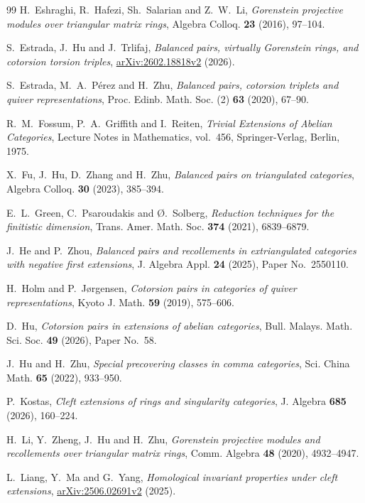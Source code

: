 \documentclass[11pt]{amsart}
\theoremstyle{definition}
\theoremstyle{remark}
\theoremstyle{plain}
\numberwithin{equation}{section}
\begin{document}
\begin{thebibliography}{99}
H.~Eshraghi, R.~Hafezi, Sh.~Salarian and Z.~W.~Li,
\emph{Gorenstein projective modules over triangular matrix rings},
Algebra Colloq. \textbf{23} (2016), 97--104.

S.~Estrada, J.~Hu and J.~Trlifaj,
\emph{Balanced pairs, virtually Gorenstein rings, and cotorsion torsion triples},
\href{https://arxiv.org/abs/2602.18818v2}{arXiv:2602.18818v2} (2026).

S.~Estrada, M.~A.~P\'erez and H.~Zhu,
\emph{Balanced pairs, cotorsion triplets and quiver representations},
Proc. Edinb. Math. Soc. (2) \textbf{63} (2020), 67--90.

R.~M.~Fossum, P.~A.~Griffith and I.~Reiten,
\emph{Trivial Extensions of Abelian Categories},
Lecture Notes in Mathematics, vol.~456, Springer-Verlag, Berlin, 1975.

X.~Fu, J.~Hu, D.~Zhang and H.~Zhu,
\emph{Balanced pairs on triangulated categories},
Algebra Colloq. \textbf{30} (2023), 385--394.

E.~L.~Green, C.~Psaroudakis and {\O}.~Solberg,
\emph{Reduction techniques for the finitistic dimension},
Trans. Amer. Math. Soc. \textbf{374} (2021), 6839--6879.

J.~He and P.~Zhou,
\emph{Balanced pairs and recollements in extriangulated categories with negative first extensions},
J. Algebra Appl. \textbf{24} (2025), Paper No.~2550110.

H.~Holm and P.~J{\o}rgensen,
\emph{Cotorsion pairs in categories of quiver representations},
Kyoto J. Math. \textbf{59} (2019), 575--606.

D.~Hu,
\emph{Cotorsion pairs in extensions of abelian categories},
Bull. Malays. Math. Sci. Soc. \textbf{49} (2026), Paper No.~58.

J.~Hu and H.~Zhu,
\emph{Special precovering classes in comma categories},
Sci. China Math. \textbf{65} (2022), 933--950.

P.~Kostas,
\emph{Cleft extensions of rings and singularity categories},
J. Algebra \textbf{685} (2026), 160--224.

H.~Li, Y.~Zheng, J.~Hu and H.~Zhu,
\emph{Gorenstein projective modules and recollements over triangular matrix rings},
Comm. Algebra \textbf{48} (2020), 4932--4947.

L.~Liang, Y.~Ma and G.~Yang,
\emph{Homological invariant properties under cleft extensions},
\href{https://arxiv.org/abs/2506.02691v2}{arXiv:2506.02691v2} (2025).


\end{thebibliography}
\end{document}
